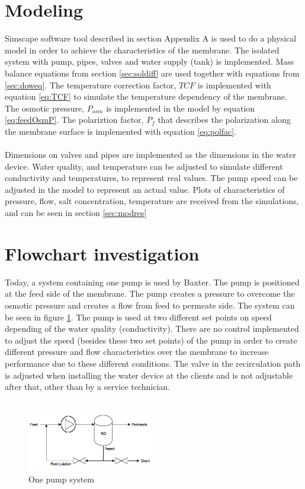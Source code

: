 \section{Modeling}
Simscape software tool described in section Appendix A is used to do a physical model in order to achieve the characteristics of the membrane. The isolated system with pump, pipes, valves and water supply (tank) is implemented. Mass balance equations from section \ref{sec:soldiff} are used together with equations from \ref{sec:doweq}. The temperature correction factor, $TCF$ is implemented with equation \ref{eq:TCF} to simulate the temperature dependency of the membrane. The osmotic pressure, $P_{osm}$ is implemented in the model by equation \ref{eq:feedOsmP}. The polariztion factor, $P_{f}$ that describes the polarization along the membrane surface is implemented with equation \ref{eq:polfac}. 
\\
\\
Dimensions on valves and pipes are implemented as the dimensions in the water device. Water quality, and temperature can be adjusted to simulate different conductivity and temperatures, to represent real values. The pump speed can be adjusted in the model to represent an actual value. Plots of characteristics of pressure, flow, salt concentration, temperature are received from the simulations, and can be seen in section \ref{sec:modres}

\section{Flowchart investigation}
\label{Flowchart}
Today, a system containing one pump is used by Baxter. The pump is positioned at the feed side of the membrane. The pump creates a pressure to overcome the osmotic pressure and creates a flow from feed to permeate side. The system can be seen in figure \ref{fig:System11}. The pump is used at two different set points on speed depending of the water quality (conductivity). There are no control implemented to adjust the speed (besides these two set points) of the pump in order to create different pressure and flow characteristics over the membrane to increase performance due to these different conditions. The valve in the recirculation path is adjusted when installing the water device at the clients and is not adjustable after that, other than by a service technician.\\
\\
\begin{figure}[h]
    \centering
    \includegraphics[width=0.5\textwidth]{Sys1}
    \caption{One pump system}
    \label{fig:System11}
\end{figure}

